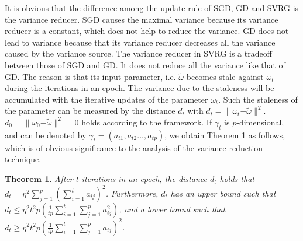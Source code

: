\documentclass[letterpaper]{article}
\begin{document}
It is obvious that the difference among the update rule of SGD, GD and SVRG is the variance reducer. SGD causes the maximal variance because its variance reducer is a constant, which does not help to reduce the variance. GD does not lead to variance because that its variance reducer decreases all the variance caused by the variance source. The variance reducer in SVRG is a tradeoff  between those of SGD and GD. It does not reduce all the variance like that of GD.  The reason is that its input parameter, i.e. $\tilde{\omega}$ becomes stale against $\omega_{t}$ during the iterations in an epoch. The variance due to the staleness will be accumulated with the iterative updates of the parameter $\omega_{t}$.   Such the staleness of the parameter can be measured by  the distance $d_t$ with $d_t = \parallel \omega_{t} \mathrm{-} \tilde{\omega} \parallel^2$. $d_0 = \parallel \omega_{0}\mathrm{-}\tilde{\omega}\parallel^2 = 0$ holds according to the framework. If $\gamma_t$ is $p$-dimensional, and can be denoted by  $\gamma_t = (a_{t1}, a_{t2}..., a_{tp})$, we obtain Theorem \ref{theorem_vr_lower_bound}  as follows, which is of obvious significance to the analysis of the variance reduction technique.


\newtheorem{Theorem}{\bf{Theorem}}
\newtheorem{Corollary}{\bf{Corollary}}
\newtheorem{Lemma}{\bf{Lemma}}
\newtheorem{Assumption}{\bf{Assumption}}


\begin{Theorem}
\label{theorem_vr_lower_bound}
   After $t$ iterations in an epoch, the distance $d_t$ holds that $d_t \mathrm{=} \eta^2 \sum\limits_{j=1}^p\left(  \sum\limits_{i=1}^t a_{ij}  \right)^2$. Furthermore, $d_t$ has an upper bound such that 
   $d_t \mathrm{\le} \eta^2 t^2p  \left( \frac{1}{tp}\sum\limits_{i=1}^t   \sum\limits_{j=1}^p   a_{ij}^2 \right)$, and a lower bound such that $d_t  \mathrm{\ge} \eta^2t^2p \left(\frac{1}{tp}\sum\limits_{i=1}^t   \sum\limits_{j=1}^p   a_{ij}\right)^2$.
\end{Theorem}
\end{document}

